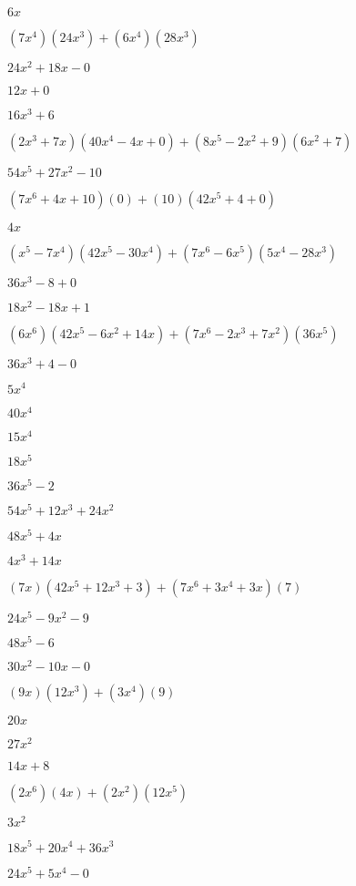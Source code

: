 \documentclass{article}
\begin{document}
\begin{multicols}{2}
$6x$\item $(7x^{4})(24x^{3})+(6x^{4})(28x^{3})$\item $24x^{2}+18x-0$\item $12x+0$\item $16x^{3}+6$\item $(2x^{3}+7x)(40x^{4}-4x+0)+(8x^{5}-2x^2+9)(6x^{2}+7)$\item $54x^{5}+27x^{2}-10$\item $(7x^{6}+4x+10)(0)+(10)(42x^{5}+4+0)$\item $4x$\item $(x^{5}-7x^{4})(42x^{5}-30x^{4})+(7x^{6}-6x^{5})(5x^{4}-28x^{3})$\item $36x^{3}-8+0$\item $18x^{2}-18x+1$\item $(6x^{6})(42x^{5}-6x^{2}+14x)+(7x^{6}-2x^{3}+7x^2)(36x^{5})$\item $36x^{3}+4-0$\item $5x^{4}$\item $40x^{4}$\item $15x^{4}$\item $18x^{5}$\item $36x^{5}-2$\item $54x^{5}+12x^{3}+24x^{2}$\item $48x^{5}+4x$\item $4x^{3}+14x$\item $(7x)(42x^{5}+12x^{3}+3)+(7x^{6}+3x^{4}+3x)(7)$\item $24x^{5}-9x^{2}-9$\item $48x^{5}-6$\item $30x^{2}-10x-0$\item $(9x)(12x^{3})+(3x^{4})(9)$\item $20x$\item $27x^{2}$\item $14x+8$\item $(2x^{6})(4x)+(2x^2)(12x^{5})$\item $3x^{2}$\item $18x^{5}+20x^{4}+36x^{3}$\item $24x^{5}+5x^{4}-0$\item 
\end{multicols}
\end{document}
